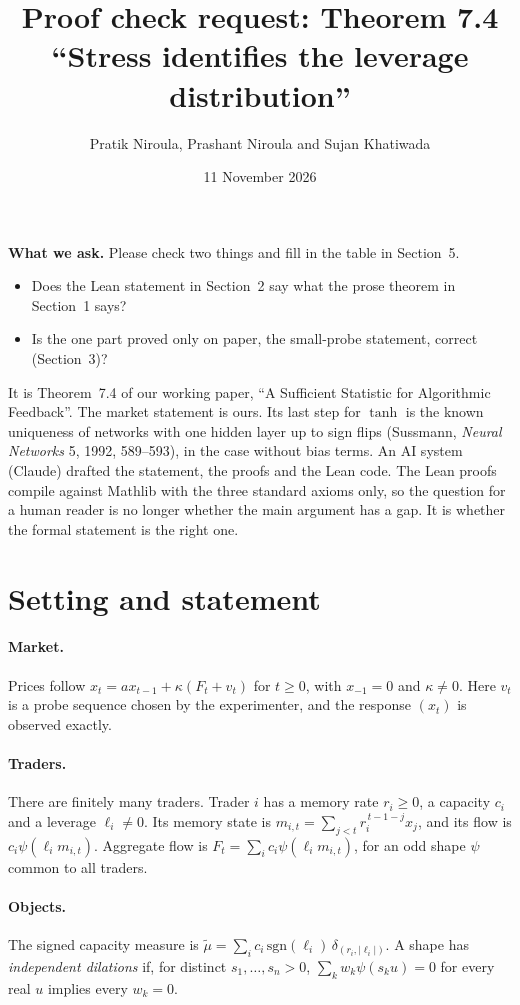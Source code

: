 \documentclass[11pt]{article}
\title{Proof check request: Theorem 7.4\\[2pt]\large ``Stress identifies the leverage distribution''}
\author{Pratik Niroula, Prashant Niroula and Sujan Khatiwada}
\date{11 November 2026}
\begin{document}
\maketitle

\noindent\textbf{What we ask.} Please check two things and fill in the table in Section~5.
\begin{itemize}[itemsep=1pt]
\item Does the Lean statement in Section~2 say what the prose theorem in Section~1 says?
\item Is the one part proved only on paper, the small-probe statement, correct (Section~3)?
\end{itemize}
It is Theorem~7.4 of our working paper, ``A Sufficient Statistic for Algorithmic Feedback''. The market statement is ours. Its last step for $\tanh$ is the known uniqueness of networks with one hidden layer up to sign flips (Sussmann, \emph{Neural Networks} 5, 1992, 589--593), in the case without bias terms. An AI system (Claude) drafted the statement, the proofs and the Lean code. The Lean proofs compile against Mathlib with the three standard axioms only, so the question for a human reader is no longer whether the main argument has a gap. It is whether the formal statement is the right one.

\section{Setting and statement}

\paragraph{Market.} Prices follow $x_t=ax_{t-1}+\kappa(F_t+v_t)$ for $t\ge0$, with $x_{-1}=0$ and $\kappa\ne0$. Here $v_t$ is a probe sequence chosen by the experimenter, and the response $(x_t)$ is observed exactly.

\paragraph{Traders.} There are finitely many traders. Trader $i$ has a memory rate $r_i\ge0$, a capacity $c_i$ and a leverage $\ell_i\ne0$. Its memory state is $m_{i,t}=\sum_{j<t}r_i^{\,t-1-j}x_j$, and its flow is $c_i\psi(\ell_im_{i,t})$. Aggregate flow is $F_t=\sum_ic_i\psi(\ell_im_{i,t})$, for an odd shape $\psi$ common to all traders.

\paragraph{Objects.} The signed capacity measure is $\tilde\mu=\sum_ic_i\,\mathrm{sgn}(\ell_i)\,\delta_{(r_i,|\ell_i|)}$. A shape has \emph{independent dilations} if, for distinct $s_1,\ldots,s_n>0$, $\sum_kw_k\psi(s_ku)=0$ for every real $u$ implies every $w_k=0$.
\end{document}
